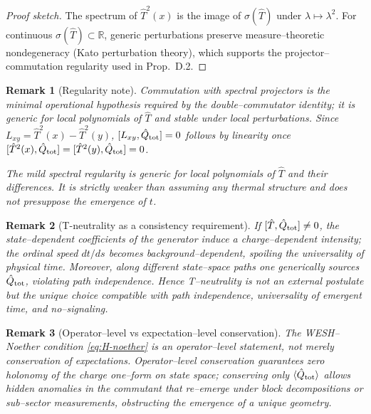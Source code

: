 \documentclass[12pt,a4paper]{article}
\newtheorem{remark}{Remark}[section]
\numberwithin{equation}{section}
\begin{document}
\begin{proof}[Proof sketch]
The spectrum of $\hat T^2(x)$ is the image of $\sigma(\hat T)$ under $\lambda\mapsto\lambda^2$. For continuous $\sigma(\hat T)\subset\mathbb{R}$, generic perturbations preserve measure–theoretic nondegeneracy (Kato perturbation theory), which supports the projector–commutation regularity used in Prop.~D.2. \qedhere
\end{proof}

\begin{remark}[Regularity note]
Commutation with spectral projectors is the minimal operational hypothesis required by the double–commutator identity; it is generic for local polynomials of $\hat T$ and stable under local perturbations. Since $L_{xy}=\hat T^2(x)-\hat T^2(y)$, $[L_{xy},\hat Q_{\rm tot}]=0$ follows by linearity once $[\hat T^2(x),\hat Q_{\rm tot}]=[\hat T^2(y),\hat Q_{\rm tot}]=0$.

\noindent The mild spectral regularity is generic for local polynomials of 
$\hat T$ and their differences. It is strictly weaker than assuming 
any thermal structure and does \emph{not} presuppose the emergence of $t$.
\end{remark}

\begin{remark}[T-neutrality as a consistency requirement]
If $[\hat T,\hat Q_{\rm tot}]\neq0$, the state–dependent coefficients of the generator induce a charge–dependent intensity; the ordinal speed $dt/ds$ becomes background–dependent, spoiling the universality of physical time. Moreover, along different state–space paths one generically sources $\hat Q_{\rm tot}$, violating path independence. Hence T–neutrality is not an external postulate but the unique choice compatible with path independence, universality of emergent time, and no–signaling.
\end{remark}

\begin{remark}[Operator–level vs expectation–level conservation]
The WESH–Noether condition \eqref{eq:H-noether} is an operator–level statement, not merely conservation of expectations. Operator–level conservation guarantees zero holonomy of the charge one–form on state space; conserving only $\langle\hat Q_{\rm tot}\rangle$ allows hidden anomalies in the commutant that re–emerge under block decompositions or sub–sector measurements, obstructing the emergence of a unique geometry.
\end{remark}

\vspace{0.3cm}
\end{document}
